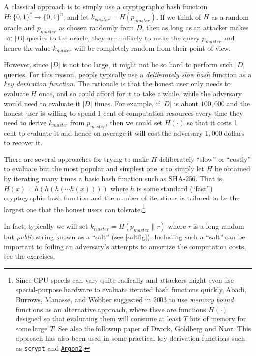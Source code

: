 A classical approach is to simply use a cryptographic hash function
\(H:\{0,1\}^*\rightarrow\{0,1\}^n\), and let
\(k_{master} = H(p_{master})\). If we think of \(H\) as a random oracle
and \(p_{master}\) as chosen randomly from \(D\), then as long as an
attacker makes \(\ll |D|\) queries to the oracle, they are unlikely to
make the query \(p_{master}\) and hence the value \(k_{master}\) will be
completely random from their point of view.

However, since \(|D|\) is not too large, it might not be so hard to
perform such \(|D|\) queries. For this reason, people typically use a
\emph{deliberately slow hash} function as a \emph{key derivation
function}. The rationale is that the honest user only needs to evaluate
\(H\) once, and so could afford for it to take a while, while the
adversary would need to evaluate it \(|D|\) times. For example, if
\(|D|\) is about \(100,000\) and the honest user is willing to spend 1
cent of computation resources every time they need to derive
\(k_{master}\) from \(p_{master}\), then we could set \(H(\cdot)\) so
that it costs 1 cent to evaluate it and hence on average it will cost
the adversary \(1,000\) dollars to recover it.

There are several approaches for trying to make \(H\) deliberately
``slow'' or ``costly'' to evaluate but the most popular and simplest one
is to simply let \(H\) be obtained by iterating many times a basic hash
function such as SHA-256. That is, \(H(x)=h(h(h(\cdots h(x))))\) where
\(h\) is some standard (``fast'') cryptographic hash function and the
number of iterations is tailored to be the largest one that the honest
users can tolerate.\footnote{Since CPU speeds can vary quite radically
  and attackers might even use special-purpose hardware to evaluate
  iterated hash functions quickly, Abadi, Burrows, Manasse, and Wobber
  suggested in 2003 to use \emph{memory bound} functions as an
  alternative approach, where these are functions \(H(\cdot)\) designed
  so that evaluating them will consume at least \(T\) bits of memory for
  some large \(T\). See also the followup paper of Dwork, Goldberg and
  Naor. This approach has also been used in some practical key
  derivation functions such as \texttt{scrypt} and
  \href{https://password-hashing.net/argon2-specs.pdf}{\texttt{Argon2}}.}

In fact, typically we will set \(k_{master} = H(p_{master}\| r)\) where
\(r\) is a long random but \emph{public} string known as a ``salt'' (see
\cref{saltfig}). Including such a ``salt'' can be important to foiling
an adversary's attempts to amortize the computation costs, see the
exercises.


